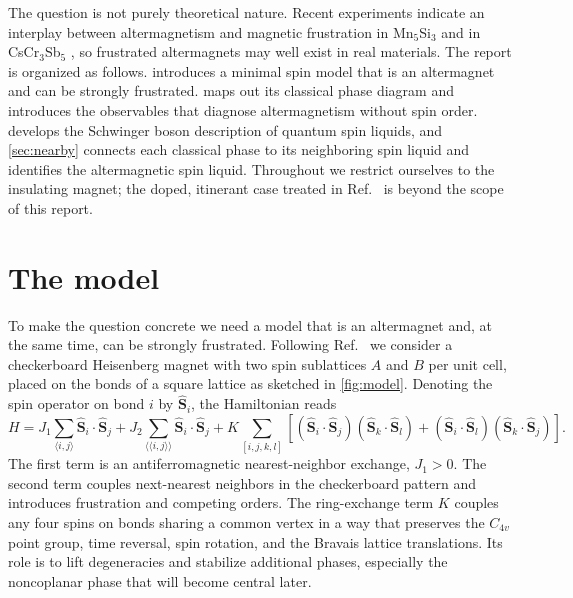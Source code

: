 \documentclass[11pt]{article}
\newcommand{\vS}{\boldsymbol{S}}
\begin{document}
The question is not purely theoretical nature. Recent experiments indicate an interplay
between altermagnetism and magnetic frustration in Mn$_5$Si$_3$
\cite{Biniskos2022,Surgers2024} and in CsCr$_3$Sb$_5$ \cite{Xu2025}, so
frustrated altermagnets may well exist in real materials. The report is
organized as follows.  introduces a minimal spin model that is
an altermagnet and can be strongly frustrated.  maps out
its classical phase diagram and introduces the observables that diagnose
altermagnetism without spin order.  develops the Schwinger boson
description of quantum spin liquids, and \cref{sec:nearby} connects each
classical phase to its neighboring spin liquid and identifies the altermagnetic
spin liquid. Throughout we restrict ourselves to the insulating magnet; the
doped, itinerant case treated in Ref.~\cite{Sobral2025} is beyond the scope of
this report.

\section{The model}
\label{sec:model}

To make the question concrete we need a model that is an altermagnet and, at
the same time, can be strongly frustrated. Following Ref.~\cite{Sobral2025} we
consider a checkerboard Heisenberg magnet with two spin sublattices $A$ and $B$
per unit cell, placed on the bonds of a square lattice as sketched in
\cref{fig:model}. Denoting the spin operator on bond $i$ by $\hat{\vS}_i$, the
Hamiltonian reads
\begin{equation}
    \label{eq:model}
    H = J_1 \sum_{\langle i,j \rangle} \hat{\vS}_i \cdot \hat{\vS}_j
      + J_2 \sum_{\langle\langle i,j \rangle\rangle} \hat{\vS}_i \cdot \hat{\vS}_j
      + K \sum_{[i,j,k,l]} \left[ (\hat{\vS}_i \cdot \hat{\vS}_j)(\hat{\vS}_k \cdot \hat{\vS}_l)
      + (\hat{\vS}_i \cdot \hat{\vS}_l)(\hat{\vS}_k \cdot \hat{\vS}_j) \right].
\end{equation}
The first term is an antiferromagnetic nearest-neighbor exchange, $J_1 > 0$.
The second term couples next-nearest neighbors in the checkerboard pattern and
introduces frustration and competing orders. The ring-exchange term $K$ couples
any four spins on bonds sharing a common vertex in a way that preserves the
$C_{4v}$ point group, time reversal, spin rotation, and the Bravais lattice
translations. Its role is to lift degeneracies and stabilize additional phases,
especially the noncoplanar phase that will become central later.
\end{document}

